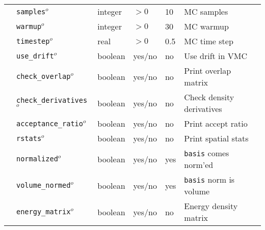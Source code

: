 \begin{table}[h]
\begin{center}
\begin{tabularx}{\textwidth}{l l l l l X }
   &\texttt{samples}$^o$       &  integer      & $>0$             & 10                  & MC samples            \\
   &\texttt{warmup}$^o$        &  integer      & $>0$             & 30                  & MC warmup             \\
   &\texttt{timestep}$^o$      &  real         & $>0$             & 0.5                 & MC time step          \\
   &\texttt{use\_drift}$^o$    &  boolean      &  yes/no          & no                  & Use drift in VMC      \\
   &\texttt{check\_overlap}$^o$&  boolean      &  yes/no          & no                  & Print overlap matrix  \\
   &\texttt{check\_derivatives}$^o$& boolean   &  yes/no          & no                  & Check density derivatives \\
   &\texttt{acceptance\_ratio}$^o$&  boolean   &  yes/no          & no                  & Print accept ratio    \\
   &\texttt{rstats}$^o$        &  boolean      &  yes/no          & no                  & Print spatial stats   \\
   &\texttt{normalized}$^o$    &  boolean      &  yes/no          & yes                 & \texttt{basis} comes norm'ed \\
   &\texttt{volume\_normed}$^o$&  boolean      &  yes/no          & yes                 & \texttt{basis} norm is volume \\
   &\texttt{energy\_matrix}$^o$&  boolean      & yes/no           & no                  & Energy density matrix \\
  \hline
\end{tabularx}
\end{center}
\end{table}
\FloatBarrier

